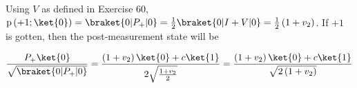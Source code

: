 \par Using $V$ as defined in Exercise 60, $\mathrm{p} \left(+1 ; \ket{0} \right)
= \braket{0|P_+|0} = \frac{1}{2} \braket{0 | I + V | 0} = \frac{1}{2} \left( 1 +
v_2 \right)$. If $+1$ is gotten, then the post-measurement state will be

$$
\frac{P_+ \ket{0}}{\sqrt{\braket{0|P_+|0}}} = \frac{\left( 1 + v_2 \right)
\ket{0} + c \ket{1}}{2 \sqrt{\frac{1 + v_2}{2}}} = \frac{\left( 1 + v_2 \right)
\ket{0} + c \ket{1}}{\sqrt{2 \left( 1 + v_2 \right)}}
$$
